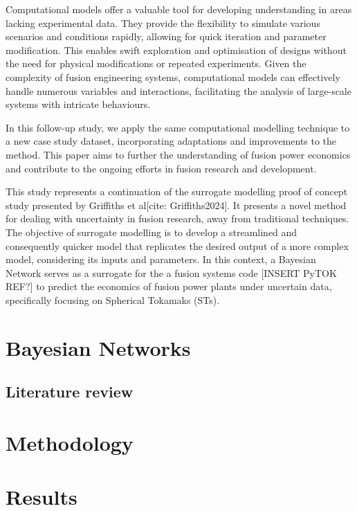 \documentclass[lettersize,journal]{IEEEtran}
\begin{document}
Computational models offer a valuable tool for developing understanding in areas lacking experimental data. They provide the flexibility to simulate various scenarios and conditions rapidly, allowing for quick iteration and parameter modification. This enables swift exploration and optimisation of designs without the need for physical modifications or repeated experiments. Given the complexity of fusion engineering systems, computational models can effectively handle numerous variables and interactions, facilitating the analysis of large-scale systems with intricate behaviours.

In this follow-up study, we apply the same computational modelling technique to a new case study dataset, incorporating adaptations and improvements to the method. This paper aims to further the understanding of fusion power economics and contribute to the ongoing efforts in fusion research and development.

This study represents a continuation of the surrogate modelling proof of concept study presented by Griffiths et al[cite: Griffiths2024]. It presents a novel method for dealing with uncertainty in fusion research, away from traditional techniques. The objective of surrogate modelling is to develop a streamlined and consequently quicker model that replicates the desired output of a more complex model, considering its inputs and parameters. In this context, a Bayesian Network serves as a surrogate for the a fusion systems code [INSERT PyTOK REF?] to predict the economics of fusion power plants under uncertain data, specifically focusing on Spherical Tokamaks (STs). 

\section{Bayesian Networks}\label{sec:BNs}


\subsection{Literature review}

\section{Methodology}\label{sec:PROCESS}


\section{Results}\label{sec: Results} 
\end{document}
